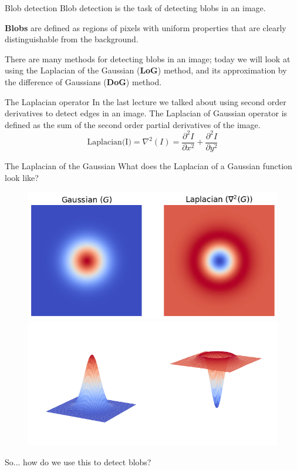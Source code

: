 \documentclass[9pt, aspectratio=169]{beamer}
\begin{document}
\begin{frame}
    {Blob detection}
    Blob detection is the task of detecting blobs in an image.

    \textbf{Blobs} are defined as regions of pixels with uniform properties that are clearly distinguishable from the background.

    There are many methods for detecting blobs in an image; today we will look at using the Laplacian of the Gaussian (\textbf{LoG}) method, and its approximation by the difference of Gaussians (\textbf{DoG}) method.
\end{frame}

\begin{frame}
    {The Laplacian operator}
    In the last lecture we talked about using second order derivatives to detect edges in an image.
    The Laplacian of Gaussian operator is defined as the sum of the second order partial derivatives of the image.
    \large{
    $$\text{Laplacian(I)} = \nabla^2(I) = \frac{\partial^2{I}}{\partial{x^2}} + \frac{\partial^2{I}}{\partial{y^2}}$$
    }
\end{frame}

\begin{frame}
    {The Laplacian of the Gaussian}
    \centering
    What does the Laplacian of a Gaussian function look like?

    \begin{figure}
        \centering
        \includegraphics[width=.45\textwidth]{gaussian_and_laplacian_2D.png}
        \includegraphics[width=.45\textwidth]{gaussian_and_laplacian_3D.png}
    \end{figure}
    \centering
    So... how do we use this to detect blobs?
\end{frame}
\end{document}
